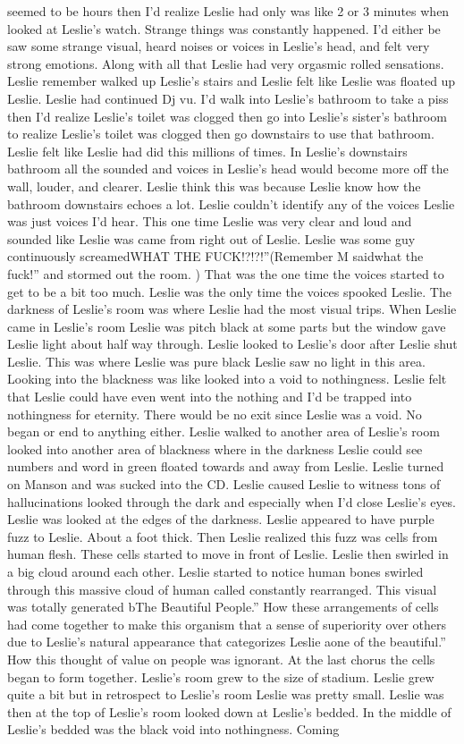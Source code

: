 \documentclass[12pt]{book}
\begin{document}
seemed to be hours then I'd realize Leslie had only was like 2 or 3 minutes when looked at Leslie's watch. Strange things was constantly happened. I'd either be saw some strange visual, heard noises or voices in Leslie's head, and felt very strong emotions. Along with all that Leslie had very orgasmic rolled sensations. Leslie remember walked up Leslie's stairs and Leslie felt like Leslie was floated up Leslie. Leslie had continued Dj vu. I'd walk into Leslie's bathroom to take a piss then I'd realize Leslie's toilet was clogged then go into Leslie's sister's bathroom to realize Leslie's toilet was clogged then go downstairs to use that bathroom. Leslie felt like Leslie had did this millions of times. In Leslie's downstairs bathroom all the sounded and voices in Leslie's head would become more off the wall, louder, and clearer. Leslie think this was because Leslie know how the bathroom downstairs echoes a lot. Leslie couldn't identify any of the voices Leslie was just voices I'd hear. This one time Leslie was very clear and loud and sounded like Leslie was came from right out of Leslie. Leslie was some guy continuously screamedWHAT THE FUCK!?!?!''(Remember M saidwhat the fuck!'' and stormed out the room. ) That was the one time the voices started to get to be a bit too much. Leslie was the only time the voices spooked Leslie. The darkness of Leslie's room was where Leslie had the most visual trips. When Leslie came in Leslie's room Leslie was pitch black at some parts but the window gave Leslie light about half way through. Leslie looked to Leslie's door after Leslie shut Leslie. This was where Leslie was pure black Leslie saw no light in this area. Looking into the blackness was like looked into a void to nothingness. Leslie felt that Leslie could have even went into the nothing and I'd be trapped into nothingness for eternity. There would be no exit since Leslie was a void. No began or end to anything either. Leslie walked to another area of Leslie's room looked into another area of blackness where in the darkness Leslie could see numbers and word in green floated towards and away from Leslie. Leslie turned on Manson and was sucked into the CD. Leslie caused Leslie to witness tons of hallucinations looked through the dark and especially when I'd close Leslie's eyes. Leslie was looked at the edges of the darkness. Leslie appeared to have purple fuzz to Leslie. About a foot thick. Then Leslie realized this fuzz was cells from human flesh. These cells started to move in front of Leslie. Leslie then swirled in a big cloud around each other. Leslie started to notice human bones swirled through this massive cloud of human called constantly rearranged. This visual was totally generated bThe Beautiful People.'' How these arrangements of cells had come together to make this organism that a sense of superiority over others due to Leslie's natural appearance that categorizes Leslie aone of the beautiful.'' How this thought of value on people was ignorant. At the last chorus the cells began to form together. Leslie's room grew to the size of stadium. Leslie grew quite a bit but in retrospect to Leslie's room Leslie was pretty small. Leslie was then at the top of Leslie's room looked down at Leslie's bedded. In the middle of Leslie's bedded was the black void into nothingness. Coming 
\end{document}
